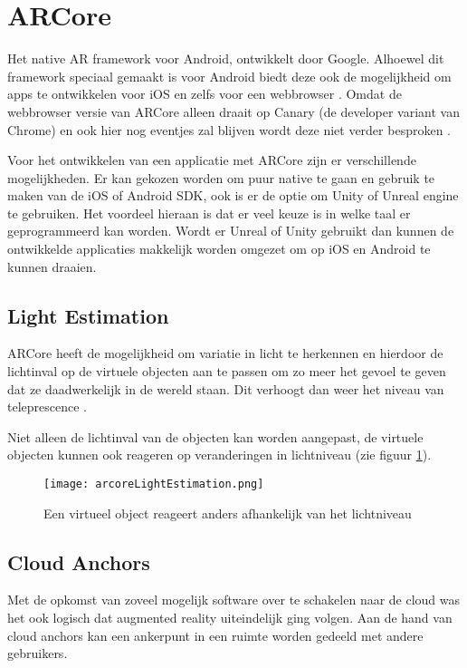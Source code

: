 \section{ARCore}
Het native AR framework voor Android, ontwikkelt door Google. Alhoewel dit framework speciaal gemaakt is voor Android biedt deze ook de mogelijkheid om apps te ontwikkelen voor iOS en zelfs voor een webbrowser \autocite{ARCoreOverview}. Omdat de webbrowser versie van ARCore alleen draait op Canary (de developer variant van Chrome) en ook hier nog eventjes zal blijven wordt deze niet verder besproken \autocite{ARCoreWeb}.

Voor het ontwikkelen van een applicatie met ARCore zijn er verschillende mogelijkheden. Er kan gekozen worden om puur native te gaan en gebruik te maken van de iOS of Android SDK, ook is er de optie om Unity of Unreal engine te gebruiken. Het voordeel hieraan is dat er veel keuze is in welke taal er geprogrammeerd kan worden. Wordt er Unreal of Unity gebruikt dan kunnen de ontwikkelde applicaties makkelijk worden omgezet om op iOS en Android te kunnen draaien. 

\subsection{Light Estimation}
ARCore heeft de mogelijkheid om variatie in licht te herkennen en hierdoor de lichtinval op de virtuele objecten aan te passen om zo meer het gevoel te geven dat ze daadwerkelijk in de wereld staan. Dit verhoogt dan weer het niveau van teleprescence \autocite{ARCoreConcepts}.

Niet alleen de lichtinval van de objecten kan worden aangepast, de virtuele objecten kunnen ook reageren op veranderingen in lichtniveau (zie figuur \ref{fig:arcoreLightEstimation}).

\begin{figure}
    \texttt{[image: arcoreLightEstimation.png]}
    \caption{Een virtueel object reageert anders afhankelijk van het lichtniveau}
    \label{fig:arcoreLightEstimation}
\end{figure}

\subsection{Cloud Anchors}
Met de opkomst van zoveel mogelijk software over te schakelen naar de cloud was het ook logisch dat augmented reality uiteindelijk ging volgen. Aan de hand van cloud anchors kan een ankerpunt in een ruimte worden gedeeld met andere gebruikers. 

